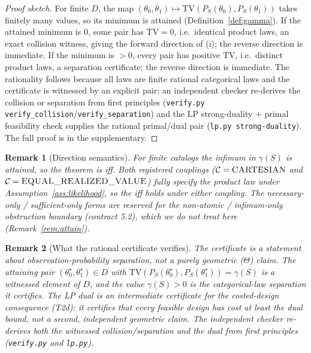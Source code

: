 \documentclass[11pt]{article}
\newtheorem{remark}{Remark}
\begin{document}
\begin{proof}[Proof sketch]
For finite $D$, the map $(\theta_0,\theta_1)\mapsto\mathrm{TV}(P_S(\theta_0),P_S(\theta_1))$ takes
finitely many values, so its minimum is attained (Definition~\ref{def:gamma}). If the attained minimum is
$0$, some pair has $\mathrm{TV}=0$, i.e.\ identical product laws, an exact collision witness, giving the
forward direction of (i); the reverse direction is immediate. If the minimum is $>0$, every pair has
positive TV, i.e.\ distinct product laws, a separation certificate; the reverse direction is immediate.
The rationality follows because all laws are finite rational categorical laws and the certificate is
witnessed by an explicit pair; an independent checker re-derives the collision or separation from first
principles (\texttt{verify.py verify\_collision}/\texttt{verify\_separation}) and the LP
strong-duality + primal feasibility check supplies the rational primal/dual pair
(\texttt{lp.py strong-duality}). The full proof is in the supplementary.
\end{proof}

\begin{remark}[Direction semantics]\label{rem:direction}
For finite catalogs the infimum in $\gamma(S)$ is attained, so the theorem is \emph{iff}. Both
registered couplings ($\mathcal{C}=\textsc{CARTESIAN}$ and $\mathcal{C}=\textsc{EQUAL\_REALIZED\_VALUE}$)
fully specify the product law under Assumption~\ref{ass:likelihood}, so the iff holds under either
coupling. The necessary-only / sufficient-only forms are reserved for the non-atomic / infimum-only
obstruction boundary (contract 5.2), which we do not treat here (Remark~\ref{rem:attain}).
\end{remark}

\begin{remark}[What the rational certificate verifies]\label{rem:certificate}
The certificate is a statement about \emph{observation-probability separation}, not a purely geometric
($\Theta$) claim. The attaining pair $(\theta_0^\star,\theta_1^\star)\in D$ with
$\mathrm{TV}(P_S(\theta_0^\star),P_S(\theta_1^\star))=\gamma(S)$ is a witnessed element of $D$, and the
value $\gamma(S)>0$ is the categorical-law separation it certifies. The LP dual is an
\emph{intermediate} certificate for the costed-design consequence (T2d): it certifies that every
feasible design has cost at least the dual bound, not a second, independent geometric claim. The
independent checker re-derives both the witnessed collision/separation and the dual from first
principles (\texttt{verify.py} and \texttt{lp.py}).
\end{remark}
\end{document}
